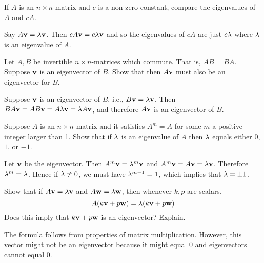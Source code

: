 \begin{enumialphparenastyle}
\begin{ex}
  If $A$ is an $n\times n$-matrix and $c$ is a non-zero constant,
  compare the eigenvalues of $A$ and $cA$.
  \begin{sol}
    Say $A\mbox{\bf v}=\lambda \mbox{\bf v}$. Then
    $ cA\mbox{\bf v}=c\lambda \mbox{\bf v}$ and so the eigenvalues of $cA$ are
    just $ c\lambda $ where $\lambda $ is an eigenvalue of $A$.
  \end{sol}
\end{ex}

\begin{ex}
  Let $A,B$ be invertible $n\times n$-matrices which commute. That is,
  $AB=BA$. Suppose $\mbox{\bf v}$ is an eigenvector of $B$. Show that then
  $A\mbox{\bf v}$ must also be an eigenvector for $B$.
  \begin{sol}
    Suppose $\mbox{\bf v}$ is an eigenvector of $B$, i.e.,
    $B\mbox{\bf v}=\lambda \mbox{\bf v}$. Then
    $BA\mbox{\bf v}=AB\mbox{\bf v} =A\lambda \mbox{\bf v}=\lambda A\mbox{\bf v}$,
    and therefore $A\mbox{\bf v}$ is an eigenvector of $B$. 
  \end{sol}
\end{ex}

\begin{ex}
  Suppose $A$ is an $n\times n$-matrix and it satisfies $A^{m}=A$ for
  some $m$ a positive integer larger than 1. Show that if $\lambda $
  is an eigenvalue of $A$ then $\lambda$ equals either $0$, $1$, or
  $-1$.
  \begin{sol}
    Let $\mbox{\bf v}$ be the eigenvector. Then
    $A^{m}\mbox{\bf v}=\lambda^{m}\mbox{\bf v}$ and
    $A^{m}\mbox{\bf v}=A\mbox{\bf v}=\lambda\mbox{\bf v}$. Therefore
    $\lambda^{m}=\lambda$. Hence if $\lambda \neq 0$, we must
    have $\lambda^{m-1}=1$, which implies that $\lambda=\pm 1$. 
  \end{sol}
\end{ex}

\begin{ex}
  Show that if $A\mbox{\bf v}=\lambda \mbox{\bf v}$ and
  $A\mbox{\bf w}=\lambda \mbox{\bf w}$, then whenever $k,p$ are scalars,
  \begin{equation*}
    A(k\mbox{\bf v}+p\mbox{\bf w}) =\lambda (k\mbox{\bf v}+p\mbox{\bf w}) 
  \end{equation*}
  Does this imply that $k\mbox{\bf v}+p\mbox{\bf w}$ is an eigenvector? Explain.
  \begin{sol}
    The formula follows from properties of matrix
    multiplication. However, this vector might not be an eigenvector
    because it might equal $0$ and eigenvectors cannot equal $0$.
  \end{sol}
\end{ex}

\end{enumialphparenastyle}
